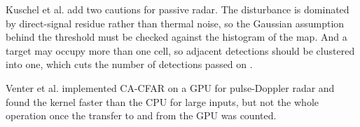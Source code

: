 Kuschel et al. \citep{kuschel2019} add two cautions for passive radar. The disturbance is dominated by direct-signal residue rather than thermal noise, so the Gaussian assumption behind the threshold must be checked against the histogram of the map. And a target may occupy more than one cell, so adjacent detections should be clustered into one, which cuts the number of detections passed on \citep{kuschel2019,colone2023}. 

Venter et al. \citep{venter2011} implemented CA-CFAR on a GPU for pulse-Doppler radar and found the kernel faster than the CPU for large inputs, but not the whole operation once the transfer to and from the GPU was counted.





